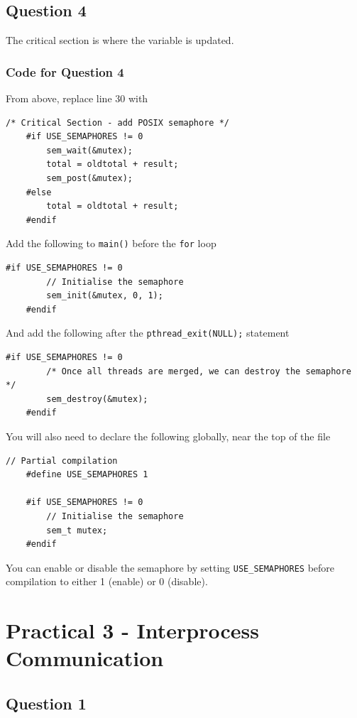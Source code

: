 \documentclass[12pt,a4paper,oneside]{article}
\begin{document}
\subsection{Question 4}
The critical section is where the variable is updated.
\subsubsection{Code for Question 4}
From above, replace line 30 with
\begin{lstlisting}[basicstyle=\small, style=ElliottCListingStyle]
	/* Critical Section - add POSIX semaphore */
	#if USE_SEMAPHORES != 0
		sem_wait(&mutex);
		total = oldtotal + result;
		sem_post(&mutex);
	#else
		total = oldtotal + result;
	#endif
\end{lstlisting}

Add the following to \texttt{main()} before the \texttt{for} loop

\begin{lstlisting}[basicstyle=\small, style=ElliottCListingStyle]
	#if USE_SEMAPHORES != 0
		// Initialise the semaphore
		sem_init(&mutex, 0, 1);
	#endif
\end{lstlisting}

And add the following after the \texttt{pthread\_exit(NULL);} statement

\begin{lstlisting}[basicstyle=\small, style=ElliottCListingStyle]
	#if USE_SEMAPHORES != 0
		/* Once all threads are merged, we can destroy the semaphore */
		sem_destroy(&mutex);
	#endif
\end{lstlisting}

You will also need to declare the following globally, near the top of the file

\begin{lstlisting}[basicstyle=\small, style=ElliottCListingStyle]
	// Partial compilation
	#define USE_SEMAPHORES 1

	#if USE_SEMAPHORES != 0
		// Initialise the semaphore
		sem_t mutex;
	#endif
\end{lstlisting}
You can enable or disable the semaphore by setting \texttt{USE\_SEMAPHORES} before compilation to either 1 (enable) or 0 (disable).  
\newpage

\section{Practical 3 - Interprocess Communication}

\subsection{Question 1}
\end{document}
